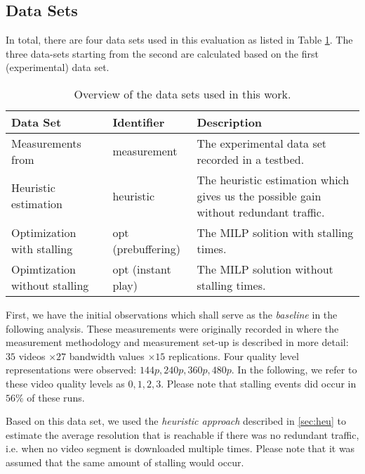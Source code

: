 
\subsection{Data Sets}
\label{sec:datasets}

In total, there are four data sets used in this evaluation as listed in Table \ref{tab:datasets}. The three data-sets starting from the second are calculated based on the first (experimental) data set.
\begin{table}
\caption{Overview of the data sets used in this work.}
\label{tab:datasets}
\centering
\begin{tabular}{p{1.8cm}p{2.1cm}p{3.2cm}}
\toprule
Data Set & Identifier & Description \\ 
\midrule 
Measurements from \cite{sieber16sacrificing} & measurement & The experimental data set recorded in a testbed. \\ 
\addlinespace
Heuristic estimation & heuristic & The heuristic estimation which gives us the possible gain without redundant traffic. \\ 
\addlinespace
Optimization with stalling & opt (prebuffering) & The MILP solition with stalling times. \\ 
\addlinespace
Opimtization without stalling & opt (instant play) & The MILP solution without stalling times. \\ 
\bottomrule
\end{tabular} 
\end{table}

First, we have the initial observations which shall serve as the \textit{baseline} in the following analysis. These measurements were originally recorded in \cite{sieber16sacrificing} where the measurement methodology and measurement set-up is described in more detail: $35$ videos $\times 27$ bandwidth values $\times 15$ replications. Four quality level representations were observed: $144p, 240p, 360p, 480p$. In the following, we refer to these video quality levels as $0,1,2,3$. Please note that stalling events did occur in $56\%$ of these runs.

Based on this data set, we used the \textit{heuristic approach} described in \ref{sec:heu} to estimate the average resolution that is reachable if there was no redundant traffic, i.e. when no video segment is downloaded multiple times. Please note that it was assumed that the same amount of stalling would occur.

